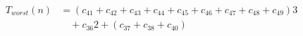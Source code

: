 \begin{align}
\label{eq:analyse-arlabeling-neighbour-case5}
T_{worst}(n)& = (c_{41} + c_{42} + c_{43} + c_{44} + c_{45} + c_{46} + c_{47} + c_{48} + c_{49})3 \\
& \quad + c_{36}2 + (c_{37} + c_{38} + c_{40}) \nonumber
\end{align}
